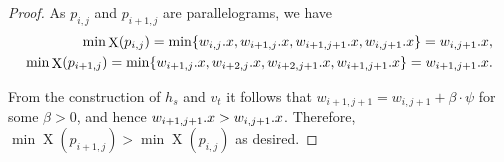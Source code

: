 \documentclass[a4paper,11pt]{article}
\DeclareMathOperator*{\X}{X}
\begin{document}
\begin{proof}
As $p_{i,j}$ and $p_{i+1,j}$ are parallelograms, we have 
\begin{align*}
\min \X(p_{i, j}) = \min\{\x{w_{i, j}}, \x{w_{i + 1,j}}, \x{w_{i + 1,j + 1}},\x{w_{i,j + 1}}\} = \x{w_{i,j + 1}},\\ 
\min \X(p_{i+1, j}) = \min\{\x{w_{i + 1, j}}, \x{w_{i + 2, j}}, \x{w_{i + 2,j + 1}},\x{w_{i+1,j + 1}}\} = \x{w_{i + 1,j + 1}}.
\end{align*}

From the construction of $h_s$ and $v_t$ it follows that $w_{i + 1,j + 1} = w_{i,j+1} + \beta \cdot \psi$ for some $\beta > 0$, and hence $w_{i + 1,j + 1}.x > w_{i,j + 1}.x$. Therefore, $\min \X(p_{i+1, j}) > \min \X(p_{i, j})$ as desired. 
\end{proof}
\end{document}
